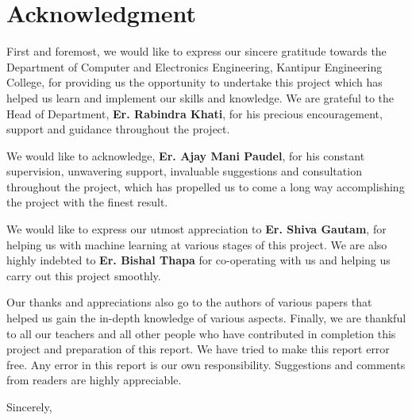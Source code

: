 
\clearpage


\KECcoverpage %
\KECtitlepage %




\chapter*{Acknowledgment}
First and foremost, we would like to express our sincere gratitude towards the Department of Computer and Electronics Engineering, Kantipur Engineering College, for providing us the opportunity to undertake this project which has helped us learn and implement our skills and knowledge. We are grateful to the Head of Department, \textbf{Er. Rabindra Khati}, for his precious encouragement, support and guidance throughout the project. \par
We would like to acknowledge, \textbf{Er. Ajay Mani Paudel}, for his constant supervision, unwavering support, invaluable suggestions and consultation throughout the project, which has propelled us to come a long way accomplishing the project with the finest result.\par
We would like to express our utmost appreciation to \textbf{Er. Shiva Gautam}, for helping us with machine learning at various stages of this project. We are also highly indebted to \textbf{Er. Bishal Thapa} for co-operating with us and helping us carry out this project smoothly.
\par
Our thanks and appreciations also go to the authors of various papers that helped us gain the in-depth knowledge of various aspects. Finally, we are thankful to all our teachers and all other people who have contributed in completion this project and preparation of this report. We have tried to make this report error free. Any error in this report is our own responsibility. Suggestions and comments from readers are highly appreciable.\\
\par
\begin{flushleft}
\vskip -20pt
Sincerely, \\
\submittedBy
\end{flushleft}

